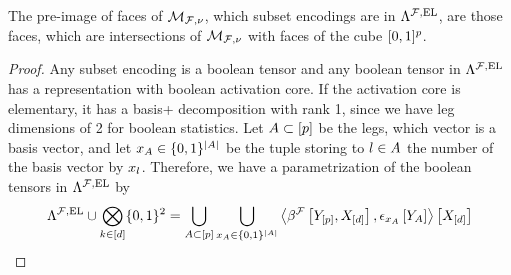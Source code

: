 \begin{theorem}
    \label{the:HLNExpressivity}
    The pre-image of faces of $\mathcal{M}_{\mathcal{F},\nu}$, which subset encodings are in $\Lambda^{\mathcal{F},\mathrm{EL}}$, are those faces, which are intersections of $\mathcal{M}_{\mathcal{F},\nu}$ with faces of the cube $[0,1]^p$.
\end{theorem}
\begin{proof}
    Any subset encoding is a boolean tensor and any boolean tensor in $\Lambda^{\mathcal{F},\mathrm{EL}}$ has a representation with boolean activation core. %
    If the activation core is elementary, it has a basis+ decomposition with rank 1, since we have leg dimensions of 2 for boolean statistics.
    Let $A\subset[p]$ be the legs, which vector is a basis vector, and let $x_{A}\in\{0,1\}^{\left|A\right|}$ be the tuple storing to $l\in A$ the number of the basis vector by $x_{l}$.
    Therefore, we have a parametrization of the boolean tensors in $\Lambda^{\mathcal{F},\mathrm{EL}}$ by
    \begin{align*}
        \Lambda^{\mathcal{F},\mathrm{EL}} \cup \bigotimes_{k\in[d]}\{0,1\}^{2}
        = \bigcup_{A\subset[p]} \bigcup_{x_{A}\in\{0,1\}^{\left|A\right|}}
        \left\langle \beta^{\mathcal{F}}\left[Y_{[p]},X_{[d]}\right],\epsilon_{x_{A}}\left[Y_{A}\right]\right\rangle \left[ X_{[d]} \right]
    \end{align*}


\end{proof}
